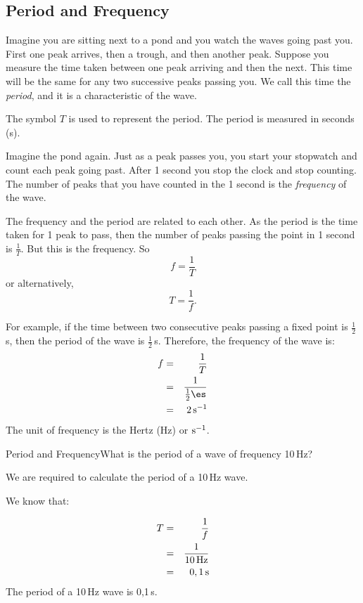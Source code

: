 \subsection{Period and Frequency}
Imagine you are sitting next to a pond and you watch the waves going past you. First one peak arrives, then a trough, and then another peak. Suppose you measure the time taken between one peak arriving and then the next. This time will be the same for any two successive peaks passing you. We call this
time the \textit{period}, and it is a characteristic of the wave.

The symbol $T$ is used to represent the period. The period is measured in seconds (s).

Imagine the pond again. Just as a peak passes you, you start your stopwatch and count each peak going past. After 1 second you stop the clock and stop counting. The number of peaks that you have counted in the 1 second is the \emph{frequency} of the wave.

The frequency and the period are related to each other. As the period is the time taken for 1 peak to pass, then the number of peaks passing the point in 1 second is $\frac{1}{T}$. But this is the frequency. So
\begin{equation*}
f=\frac{1}{T}
\end{equation*}
or alternatively,
\begin{equation*}
T=\frac{1}{f}.
\end{equation*}

For example, if the time between two consecutive peaks passing a fixed point is $\frac{1}{2}\,$s, then the period of the wave is $\frac{1}{2}\,$s. Therefore, the frequency of the wave is:
\begin{eqnarray*}
f&=&\frac{1}{T}\\
&=&\frac{1}{\frac{1}{2}\es}\\
&=&2\,\mathrm{s^{-1}}
\end{eqnarray*}
The unit of frequency is the Hertz (Hz) or $\rm{s}^{-1}$.

\begin{wex}{Period and Frequency}{What is the period of a wave of frequency 10\,Hz?}{
We are required to calculate the period of a 10\,Hz wave.

We know that:

\begin{eqnarray*}
T&=&\frac{1}{f}\\
&=&\frac{1}{10\,\rm{Hz}}\\
&=&0,1\,\rm{s}
\end{eqnarray*}
The period of a 10\,Hz wave is 0,1\,s.}
\end{wex}

